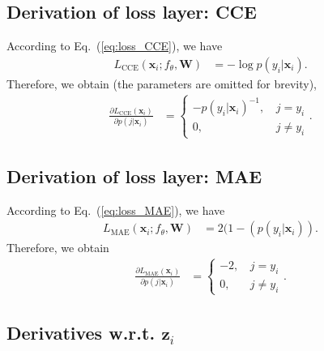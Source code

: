 \documentclass{article}
\begin{document}
\noindent
\subsection{Derivation of loss layer: CCE}
According to Eq.~(\ref{eq:loss_CCE}), 
we have
\begin{equation}
\label{eq:loss_CCE_x_i}
\begin{aligned}
L_{\mathrm{CCE}} (\mathbf{x}_i;f_\theta,\mathbf{W}) 
&= 	- \log p(y_i|\mathbf{x}_i)
.
\end{aligned}
\end{equation}
Therefore, we obtain (the parameters are omitted for brevity),   
\begin{equation}
\label{eq:derivation_CCE_x_i}
\begin{aligned}
\frac{\partial L_{\mathrm{CCE}}(\mathbf{x}_i)}{\partial p(j|\mathbf{x}_i)} 
&=
\begin{cases} 
-p(y_i|\mathbf{x}_i)^{-1} 
\text{, } &j = y_i  \\
0       
\text{, } &j \neq y_i
\end{cases}
.
\end{aligned}
\end{equation}



\noindent
\subsection{Derivation of loss layer: MAE}
According to Eq.~(\ref{eq:loss_MAE}), 
we have
\begin{equation}
\label{eq:loss_MAE_x_i}
\begin{aligned}
L_{\mathrm{MAE}} (\mathbf{x}_i;f_\theta,\mathbf{W}) 
&= 	2(1- (p(y_i|\mathbf{x}_i))
.
\end{aligned}
\end{equation}
Therefore, we obtain \begin{equation}
\label{eq:derivation_MAE_x_i}
\begin{aligned}
\frac{\partial L_{\mathrm{MAE}}(\mathbf{x}_i)}{\partial p(j|\mathbf{x}_i)} 
&=
\begin{cases} 
-2  \text{, } &j = y_i  \\
0        \text{, } &j \neq y_i
\end{cases}
.
\end{aligned}
\end{equation}



\subsection{Derivatives w.r.t. $\mathbf{z}_{i}$}
\end{document}
